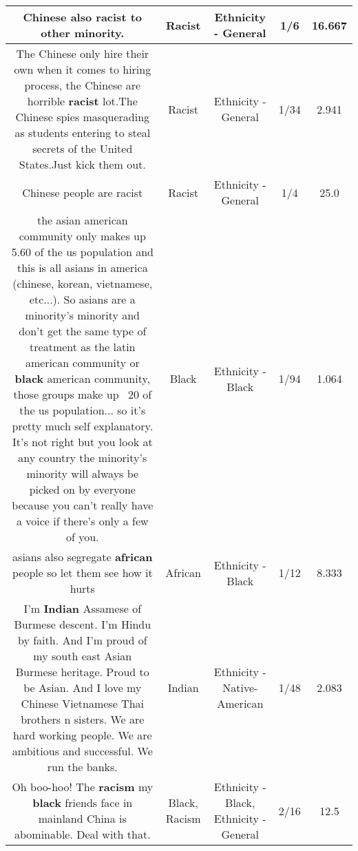 \documentclass[11pt]{article}
\newlength\mylength
\begin{document}
\begin{center}
\begin{longtable}{|C{.65\mylength}|C{.30\mylength}|C{.12\mylength}|C{.12\mylength}|C{.12\mylength}|}
  \small Chinese also \textbf{racist} to other minority.\normalsize   & Racist & Ethnicity - General & 1/6 & 16.667 \\  \hline
  \small The Chinese only hire their own when it comes to hiring process, the Chinese are horrible \textbf{racist} lot.The Chinese spies masquerading as students entering to steal secrets of the United States.Just kick them out.\normalsize   & Racist & Ethnicity - General & 1/34 & 2.941 \\  \hline
  \small Chinese people are racist\normalsize   & Racist & Ethnicity - General & 1/4 & 25.0 \\  \hline
  \small the asian american community only makes up 5.60 of the us population and this is all asians in america (chinese, korean, vietnamese, etc...). So asians are a minority's minority and don't get the same type of treatment as the latin american community or \textbf{black} american community, those groups make up ~20 of the us population... so it's pretty much self explanatory.  It's not right but you look at any country the minority's minority will always be picked on by everyone because you can't really have a voice if there's only a few of you.\normalsize   & Black & Ethnicity - Black & 1/94 & 1.064 \\  \hline
  \small asians also segregate \textbf{african} people so let them see how it hurts\normalsize   & African & Ethnicity - Black & 1/12 & 8.333 \\  \hline
  \small I'm \textbf{Indian} Assamese of Burmese descent.  I'm Hindu by faith.  And I'm proud of my south east Asian Burmese heritage.  Proud to be Asian.  And I love my Chinese Vietnamese Thai brothers n sisters.  We are hard working people.  We are ambitious and successful.  We run the banks.\normalsize   & Indian & Ethnicity - Native-American & 1/48 & 2.083 \\  \hline
  \small Oh boo-hoo! The \textbf{racism} my \textbf{black} friends face in mainland China is abominable. Deal with that.\normalsize   & Black, Racism & Ethnicity - Black, Ethnicity - General & 2/16 & 12.5 \\  \hline

\end{longtable}
\end{center}
\end{document}
